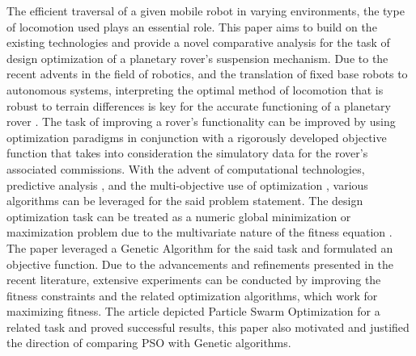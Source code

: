 \documentclass[default,iicol]{sn-jnl}
\theoremstyle{thmstyleone}
\theoremstyle{thmstyletwo}
\theoremstyle{thmstylethree}
\begin{document}
The efficient traversal of a given mobile robot in varying environments, the type of locomotion used plays an essential role. This paper aims to build on the existing technologies and provide a novel comparative analysis for the task of design optimization of a planetary rover’s suspension mechanism.
Due to the recent advents in the field of robotics, and the translation of fixed base robots to autonomous systems, interpreting the optimal method of locomotion that is robust to terrain differences is key for the accurate functioning of a planetary rover \cite{bib1}. The task of improving a rover’s functionality can be improved by using optimization paradigms in conjunction with a rigorously developed objective function that takes into consideration the simulatory data for the rover's associated commissions. With the advent of computational technologies, predictive analysis \cite{bib2}, and the multi-objective use of optimization \cite{bib3}, various algorithms can be leveraged for the said problem statement. The design optimization task can be treated as a numeric global minimization or maximization problem due to the multivariate nature of the fitness equation \cite{bib1}. The paper \cite{bib1} leveraged a Genetic Algorithm for the said task and formulated an objective function. Due to the advancements and refinements presented in the recent literature, extensive experiments can be conducted by improving the fitness constraints and the related optimization algorithms, which work for maximizing fitness. The article \cite{bib4} depicted Particle Swarm Optimization for a related task and proved successful results, this paper also motivated and justified the direction of comparing PSO with Genetic algorithms.
\end{document}
